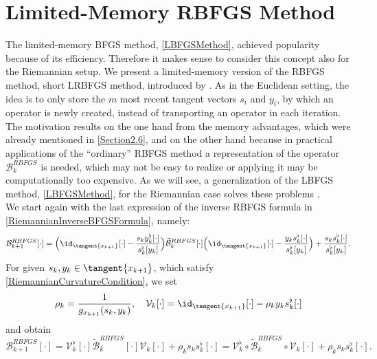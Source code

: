 \section{Limited-Memory RBFGS Method}
\label{Section4.6}

The limited-memory BFGS method, \cref{LBFGSMethod}, achieved popularity because of its efficiency. Therefore it makes sense to consider this concept also for the Riemannian setup. We present a limited-memory version of the RBFGS method, short LRBFGS method, introduced by \cite{HuangGallivanAbsil:2015}. As in the Euclidean setting, the idea is to only store the $m$ most recent tangent vectors $s_i$ and $y_i$, by which an operator is newly created, instead of transporting an operator in each iteration. \\ 
The motivation results on the one hand from the memory advantages, which were already mentioned in \cref{Section2.6}, and on the other hand because in practical applications of the “ordinary” RBFGS method a representation of the operator $\mathcal{B}^{RBFGS}_k$ is needed, which may not be easy to realize or applying it may be computationally too expensive. As we will see, a generalization of the LBFGS method, \cref{LBFGSMethod}, for the Riemannian case solves these problems \cite[p.~1676]{HuangGallivanAbsil:2015}. \\
We start again with the last expression of the inverse RBFGS formula in \cref{RiemannianInverseBFGSFormula}, namely:
\begin{equation*}
    	\mathcal{B}^{RBFGS}_{k+1} [\cdot] = \Big{(} \id_{\tangent{x_{k+1}}}[\cdot] - \frac{s_k y^{\flat}_k [\cdot]}{s^{\flat}_k [y_k]} \Big{)} \widetilde{\mathcal{B}}^{RBFGS}_k [\cdot] \Big{(} \id_{\tangent{x_{k+1}}}[\cdot] - \frac{y_k s^{\flat}_k [\cdot]}{s^{\flat}_k [y_k]} \Big{)} + \frac{s_k s^{\flat}_k [\cdot]}{s^{\flat}_k [y_k]}.
\end{equation*}
For given $s_k, y_k \in \tangent{x_{k+1}}$, which satisfy \cref{RiemannianCurvatureCondition}, we set 
\begin{equation}\label{RiemannianLimitedMemoryVariables}
    \rho_k = \frac{1}{g_{x_{k+1}}(s_k, y_k)} , \quad \mathcal{V}_k [\cdot] = \id_{\tangent{x_{k+1}}}[\cdot] - \rho_k y_k s^{\flat}_k [\cdot]
\end{equation}
and obtain
\begin{equation}\label{RiemannianLimitedMemoryFormula}
    \mathcal{B}^{RBFGS}_{k+1} [\cdot] = \mathcal{V}^{\flat}_k [\cdot] \widetilde{\mathcal{B}}^{RBFGS}_k [\cdot] \mathcal{V}_k [\cdot] + \rho_k s_k s_k^{\flat} [\cdot] = \mathcal{V}^{\flat}_k \circ \widetilde{\mathcal{B}}^{RBFGS}_k \circ \mathcal{V}_k [\cdot] + \rho_k s_k s_k^{\flat} [\cdot].
\end{equation} 
